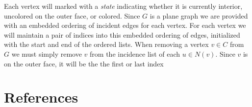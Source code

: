 \documentclass[11pt,letter]{article}
\begin{document}
Each vertex will marked with a \emph{state}
indicating whether it is currently interior, uncolored on the outer face, or colored. Since $G$ is a plane graph
we are provided with an embedded ordering of incident edges for each vertex. For each vertex we will maintain
a pair of indices into this embedded ordering of edges, initialized with the start and end of the ordered lists.
When removing a vertex $v\in C$ from $G$ we must simply remove $v$ from the incidence list of each $u\in N(v)$.
Since $v$ is on the outer face, it will be the the first or last index 

\begin{comment}
\begin{algorithm}
\LinesNumbered
\DontPrintSemicolon
\KwIn{Plane graph $G$ and paths $P=p_0\ldots p_n$ and $Q=q_0\ldots q_m$}
\Begin{
	\Repeat{$t_0\not\in P\cup Q$} {
		$t_0\longleftarrow$ vertex forming face with $p_0$ and $q_0$\;
		\If{$t_0 = p_1$} {
			$P\longleftarrow P - p_0$\;
		}
		\ElseIf{$t_0 = q_1$} {
			$Q\longleftarrow Q - q_0$\; 
		}
	}
	\Repeat{$t_1\not\in P\cup Q$} {
		$t_1\longleftarrow$ vertex forming face with $p_n$ and $q_m$\;
		\If{$t_1 = p_{n-1}$} {
			$P\longleftarrow P - p_n$\;
		}
		\ElseIf{$t_1 = q_{m-1}$} {
			$Q\longleftarrow Q - q_m$\; 
		}
	}
	perform BFS starting at $t_1$\;
	\If{BFS finds $t_0$} {
		$T\longleftarrow$ BFS path $t_0$ to $t_1$\;
	}
	\Else {
		we hit an vertex $u$ with neighbors $p_i\in P$ and $q_j\in Q$\;
		$T\longleftarrow$ BFS path $u$ to $t_1$\;
		recurse on subgraph bounded by $p_0\ldots p_i$ and $q_0\ldots q_j$\;
		$P\longleftarrow p_i\ldots p_n$\;
		$Q\longleftarrow q_j\ldots q_m$\;
	}
	recurse on subgraph bounded by $P$ and $T$\;
	recurse on subgraph bounded by $T$ and $Q$\;
}
\caption{Path 3-Color}
\end{algorithm}
\end{comment}

\section*{References}
\end{document}
